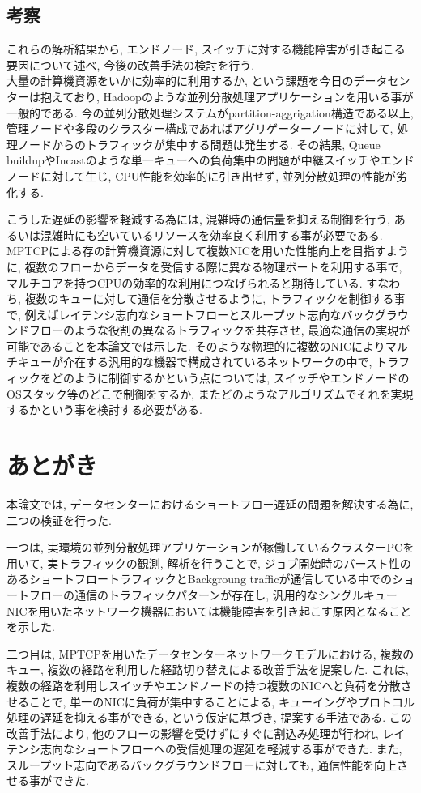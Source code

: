 \documentclass[11pt, a4paper, twocolumn]{jsarticle}
\begin{document}
\subsection{考察}
\label{sec:analysis}
これらの解析結果から, エンドノード, スイッチに対する機能障害が引き起こる要因について述べ, 今後の改善手法の検討を行う.\\
大量の計算機資源をいかに効率的に利用するか, という課題を今日のデータセンターは抱えており,
Hadoopのような並列分散処理アプリケーションを用いる事が一般的である.
今の並列分散処理システムがpartition-aggrigation構造である以上, 管理ノードや多段のクラスター構成であればアグリゲーターノードに対して, 処理ノードからのトラフィックが集中する問題は発生する.
その結果, Queue buildupやIncastのような単一キューへの負荷集中の問題が中継スイッチやエンドノードに対して生じ,
CPU性能を効率的に引き出せず, 並列分散処理の性能が劣化する.

こうした遅延の影響を軽減する為には, 混雑時の通信量を抑える制御を行う, あるいは混雑時にも空いているリソースを効率良く利用する事が必要である.
MPTCPによる存の計算機資源に対して複数NICを用いた性能向上を目指すように, 複数のフローからデータを受信する際に異なる物理ポートを利用する事で,
マルチコアを持つCPUの効率的な利用につなげられると期待している.
すなわち, 複数のキューに対して通信を分散させるように, トラフィックを制御する事で,
例えばレイテンシ志向なショートフローとスループット志向なバックグラウンドフローのような役割の異なるトラフィックを共存させ,
最適な通信の実現が可能であることを本論文では示した.
そのような物理的に複数のNICによりマルチキューが介在する汎用的な機器で構成されているネットワークの中で,
トラフィックをどのように制御するかという点については, スイッチやエンドノードのOSスタック等のどこで制御をするか, またどのようなアルゴリズムでそれを実現するかという事を検討する必要がある.

\section{あとがき}
\label{sec:conclude}
本論文では, データセンターにおけるショートフロー遅延の問題を解決する為に, 二つの検証を行った.

一つは, 実環境の並列分散処理アプリケーションが稼働しているクラスターPCを用いて, 実トラフィックの観測, 解析を行うことで,
ジョブ開始時のバースト性のあるショートフロートラフィックとBackgroung
trafficが通信している中でのショートフローの通信のトラフィックパターンが存在し,
汎用的なシングルキューNICを用いたネットワーク機器においては機能障害を引き起こす原因となることを示した.

二つ目は, MPTCPを用いたデータセンターネットワークモデルにおける, 複数のキュー, 複数の経路を利用した経路切り替えによる改善手法を提案した.
これは, 複数の経路を利用しスイッチやエンドノードの持つ複数のNICへと負荷を分散させることで, 単一のNICに負荷が集中することによる,
キューイングやプロトコル処理の遅延を抑える事ができる, という仮定に基づき, 提案する手法である.
この改善手法により, 他のフローの影響を受けずにすぐに割込み処理が行われ, レイテンシ志向なショートフローへの受信処理の遅延を軽減する事ができた.
また, スループット志向であるバックグラウンドフローに対しても, 通信性能を向上させる事ができた.
\end{document}
